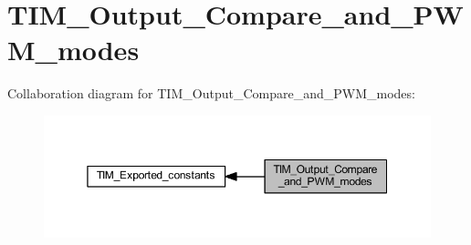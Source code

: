 \hypertarget{group___t_i_m___output___compare__and___p_w_m__modes}{}\section{T\+I\+M\+\_\+\+Output\+\_\+\+Compare\+\_\+and\+\_\+\+P\+W\+M\+\_\+modes}
\label{group___t_i_m___output___compare__and___p_w_m__modes}
Collaboration diagram for T\+I\+M\+\_\+\+Output\+\_\+\+Compare\+\_\+and\+\_\+\+P\+W\+M\+\_\+modes\+:\nopagebreak
\begin{figure}[H]
\begin{center}
\leavevmode
\includegraphics[width=350pt]{group___t_i_m___output___compare__and___p_w_m__modes}
\end{center}
\end{figure}
